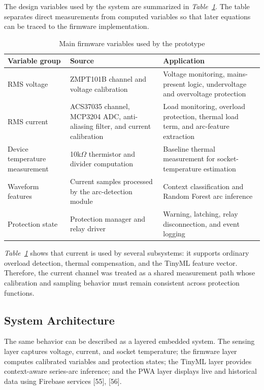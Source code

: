 The design variables used by the system are summarized in
\textit{Table~\ref{tab:ch3-system-variables}}. The table separates direct
measurements from computed variables so that later equations can be traced to
the firmware implementation.
\begin{table}[H]
  \centering
  \caption{Main firmware variables used by the prototype}
  \label{tab:ch3-system-variables}
  \begin{tabular}{p{}p{}p{}}
    \toprule
    \textbf{Variable group} & \textbf{Source} & \textbf{Application} \\
    \midrule
    RMS voltage & ZMPT101B channel and voltage calibration & Voltage monitoring, mains-present logic, undervoltage and overvoltage protection \\
    RMS current & ACS37035 channel, MCP3204 ADC, anti-aliasing filter, and current calibration & Load monitoring, overload protection, thermal load term, and arc-feature extraction \\
    Device temperature measurement & 10k$\Omega$ thermistor and divider computation & Baseline thermal measurement for socket-temperature estimation \\
    Waveform features & Current samples processed by the arc-detection module & Context classification and Random Forest arc inference \\
    Protection state & Protection manager and relay driver & Warning, latching, relay disconnection, and event logging \\
    \bottomrule
  \end{tabular}
\end{table}

\textit{Table~\ref{tab:ch3-system-variables}} shows that current is used by several
subsystems: it supports ordinary overload detection, thermal compensation, and
the TinyML feature vector. Therefore, the current channel was treated as a
shared measurement path whose calibration and sampling behavior must remain
consistent across protection functions.

\subsection{System Architecture}
\label{sec:ch3-system-architecture-discussion}

The same behavior can be described as a layered embedded system. The sensing
layer captures voltage, current, and socket temperature; the firmware layer
computes calibrated variables and protection states; the TinyML layer provides
context-aware series-arc inference; and the PWA layer displays live and
historical data using Firebase services [55], [56].

